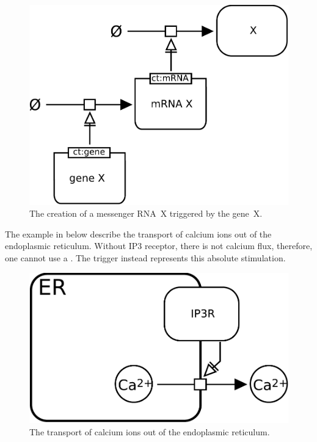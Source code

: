 \begin{figure}[H]
  \centering
  \includegraphics[scale = 0.5]{examples/trigger-genetic}
  \caption{The creation of a messenger RNA~X triggered by the gene~X.}
  \label{fig:trigger-gene}
\end{figure}


The example in  below describe the transport of calcium ions out of the endoplasmic reticulum. Without IP3 receptor, there is not calcium flux, therefore, one cannot use a . The trigger instead represents this absolute stimulation.

\begin{figure}[H]
  \centering
  \includegraphics[scale = 0.5]{examples/trigger-transport}
  \caption{The transport of calcium ions out of the endoplasmic reticulum.}
  \label{fig:trigger-calcium}
\end{figure}




